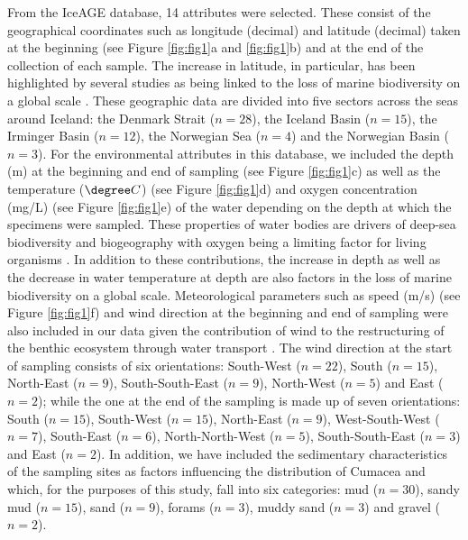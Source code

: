 From the IceAGE database, 14 attributes were selected. These consist of the geographical coordinates such as longitude (decimal) and latitude (decimal) taken at the beginning (see Figure \ref{fig:fig1}a and \ref{fig:fig1}b) and at the end of the collection of each sample. The increase in latitude, in particular, has been highlighted by several studies as being linked to the loss of marine biodiversity on a global scale \citep{rex_global-scale_1993, lambshead_latitudinal_2000, gage_diversity_2004}. These geographic data are divided into five sectors across the seas around Iceland: the Denmark Strait (\( n=28 \)), the Iceland Basin (\( n=15 \)), the Irminger Basin (\( n=12 \)), the Norwegian Sea (\( n=4 \)) and the Norwegian Basin (\( n=3 \)). For the environmental attributes in this database, we included the depth (m) at the beginning and end of sampling (see Figure \ref{fig:fig1}c) as well as the temperature (\( \degree C \)) (see Figure \ref{fig:fig1}d) and oxygen concentration (mg/L) (see Figure \ref{fig:fig1}e) of the water depending on the depth at which the specimens were sampled. These properties of water bodies are drivers of deep-sea biodiversity and biogeography with oxygen being a limiting factor for living organisms \citep{keeling_ocean_2010}. In addition to these contributions, the increase in depth \citep{rex_global_2006, costello_marine_2017} as well as the decrease in water temperature at depth \citep{lambshead_latitudinal_2000} are also factors in the loss of marine biodiversity on a global scale. Meteorological parameters such as speed (m/s) (see Figure \ref{fig:fig1}f) and wind direction at the beginning and end of sampling were also included in our data given the contribution of wind to the restructuring of the benthic ecosystem through water transport \citep{saeedi_environmental_2022, waga_recent_2020}. The wind direction at the start of sampling consists of six orientations: South-West (\( n=22 \)), South (\( n=15 \)), North-East (\( n=9 \)), South-South-East (\( n=9 \)), North-West (\( n=5 \)) and East (\( n=2 \)); while the one at the end of the sampling is made up of seven orientations: South (\( n=15 \)), South-West (\( n=15 \)), North-East (\( n=9 \)), West-South-West (\( n=7 \)), South-East (\( n=6 \)), North-North-West (\( n=5 \)), South-South-East (\( n=3 \)) and East (\( n=2 \)). In addition, we have included the sedimentary characteristics of the sampling sites as factors influencing the distribution of Cumacea \citep{uhlir_adding_2021} and which, for the purposes of this study, fall into six categories: mud (\( n=30 \)), sandy mud (\( n=15 \)), sand (\( n=9 \)), forams (\( n=3 \)), muddy sand (\( n=3 \)) and gravel (\( n=2 \)).

